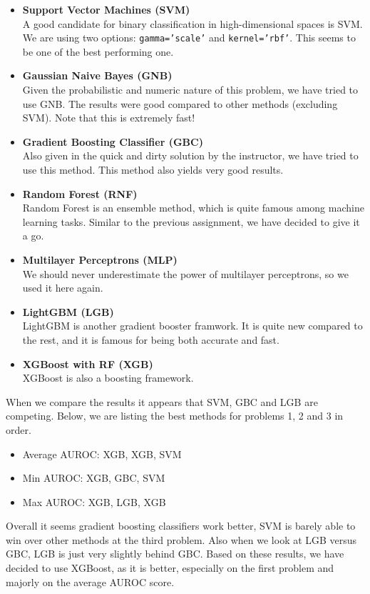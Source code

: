 \documentclass[11pt,reqno]{amsart}
\newcommand{\code}[1]{\texttt{#1}}
\begin{document}
\begin{itemize}
	\item \textbf{Support Vector Machines (SVM)} \\
	A good candidate for binary classification in high-dimensional spaces is SVM. We are using two options: \code{gamma='scale'} and \code{kernel='rbf'}. This seems to be one of the best performing one.
	\item \textbf{Gaussian Naive Bayes (GNB)} \\
	Given the probabilistic and numeric nature of this problem, we have tried to use GNB. The results were good compared to other methods (excluding SVM). Note that this is extremely fast!
	\item \textbf{Gradient Boosting Classifier (GBC)} \\
	Also given in the quick and dirty solution by the instructor, we have tried to use this method. This method also yields very good results.
	\item \textbf{Random Forest (RNF)} \\
	Random Forest is an ensemble method, which is quite famous among machine learning tasks. Similar to the previous assignment, we have decided to give it a go.
	\item \textbf{Multilayer Perceptrons (MLP)} \\
	We should never underestimate the power of multilayer perceptrons, so we used it here again.
	\item \textbf{LightGBM (LGB)} \\
	LightGBM is another gradient booster framwork. It is quite new compared to the rest, and it is famous for being both accurate and fast.
	\item \textbf{XGBoost with RF (XGB)} \\
	XGBoost is also a boosting framework.
\end{itemize}
When we compare the results it appears that SVM, GBC and LGB are competing. Below, we are listing the best methods for problems 1, 2 and 3 in order.
\begin{itemize}
	\item Average AUROC: XGB, XGB, SVM
	\item Min AUROC: XGB, GBC, SVM
	\item Max AUROC: XGB, LGB, XGB 
\end{itemize}
Overall it seems gradient boosting classifiers work better, SVM is barely able to win over other methods at the third problem. Also when we look at LGB versus GBC, LGB is just very slightly behind GBC. Based on these results, we have decided to use XGBoost, as it is better, especially on the first problem and majorly on the average AUROC score.
\end{document}
